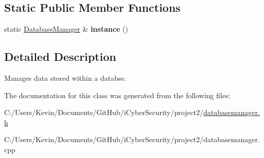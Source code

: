 \subsection*{Static Public Member Functions}
\begin{DoxyCompactItemize}
\item 
\mbox{\label{class_database_manager_a4abb527066e28f3928ef45af856e134c}} 
static \mbox{\hyperlink{class_database_manager}{Database\+Manager}} \& {\bfseries instance} ()
\end{DoxyCompactItemize}


\subsection{Detailed Description}
Manages data stored within a databse. 

The documentation for this class was generated from the following files\+:\begin{DoxyCompactItemize}
\item 
C\+:/\+Users/\+Kevin/\+Documents/\+Git\+Hub/i\+Cyber\+Security/project2/\mbox{\hyperlink{databasemanager_8h}{databasemanager.\+h}}\item 
C\+:/\+Users/\+Kevin/\+Documents/\+Git\+Hub/i\+Cyber\+Security/project2/databasemanager.\+cpp\end{DoxyCompactItemize}
